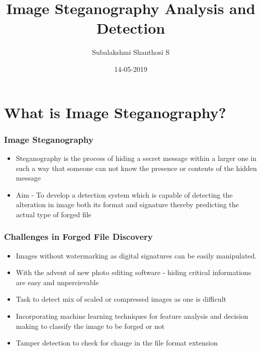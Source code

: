 \documentclass{beamer} %
\title{Image Steganography Analysis and Detection}
\author{Subalakshmi Shanthosi S}
\institute{SSN College of Engineering}
\date{}
\date[short date]{14-05-2019}
\theoremstyle{definition} %
\begin{document}
\begin{frame} 
\titlepage
\end{frame}

\section{What is Image Steganography?} %

\begin{frame} 
\frametitle{Image Steganography}
 \begin{itemize}
 \item{Steganography is the process of hiding a secret message within a
 larger one in such a way that someone can not know the presence or contents
 of the hidden message }
\end{itemize}
\begin{itemize}
 \item{Aim - To develop a detection system which is capable of detecting the alteration in image both its format and signature thereby predicting the actual type of forged file 
 }
\end{itemize}

\end{frame}

\begin{frame}
\frametitle{Challenges in Forged File Discovery}
 \begin{itemize}
	\item{Images without watermarking as digital signatures can be easily manipulated.}
\end{itemize}
\begin{itemize}
	\item{With the advent of new photo editing software - hiding critical informations are easy and unpercievable }
\end{itemize}
\begin{itemize}
	\item {Task to detect mix of scaled or compressed images as one is difficult}
\end{itemize}
\begin{itemize}
	\item{Incorporating machine learning techniques for feature analysis and decision making  to classify the image to be forged or not  
	}
   \item{Tamper detection to check for change in the file format extension}
\end{itemize}
\end{frame}
\end{document}
